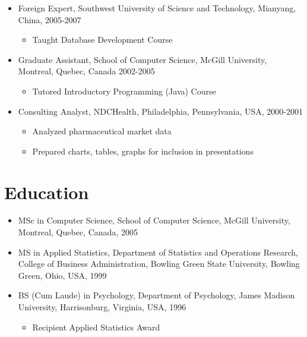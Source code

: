 \documentclass{res}
\begin{document}
\begin{resume}
\begin{itemize}
\begin{itemize}
      \end{itemize}
    \item Foreign Expert, Southwest University of Science and Technology, Mianyang, China, 2005-2007
      \begin{itemize}
      \item Taught Database Development Course
      \end{itemize}
    \item Graduate Assistant, School of Computer Science, McGill University, Montreal, Quebec, Canada 2002-2005
      \begin{itemize}
      \item Tutored Introductory Programming (Java) Course
      \end{itemize}
    \item Consulting Analyst, NDCHealth, Philadelphia, Pennsylvania, USA, 2000-2001
      \begin{itemize}
        \item Analyzed pharmaceutical market data
        \item Prepared charts, tables, graphs for inclusion in presentations
      \end{itemize}
  \end{itemize}
  \section{Education}
  \begin{itemize}
    \item MSc in Computer Science, School of Computer Science, McGill University, Montreal, Quebec, Canada, 2005
    \item MS in Applied Statistics, Department of Statistics and Operations Research, College of Business Administration, Bowling Green State University, Bowling Green, Ohio, USA, 1999
    \item BS (Cum Laude) in Psychology, Department of Psychology, James Madison University, Harrisonburg, Virginia, USA, 1996
      \begin{itemize}
      \item Recipient Applied Statistics Award
      \end{itemize}
  \end{itemize}
\end{resume}
\end{document}
